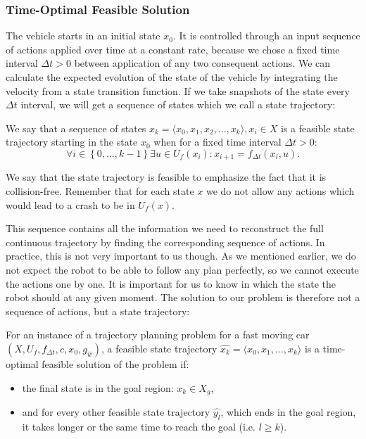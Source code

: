 \subsubsection{Time-Optimal Feasible Solution}

The vehicle starts in an initial state $x_0$. It is controlled through an input sequence of actions applied over time at a constant rate, because we chose a fixed time interval $\Delta t>0$ between application of any two consequent actions. We can calculate the expected evolution of the state of the vehicle by integrating the velocity from a state transition function. If we take snapshots of the state every $\Delta t$ interval, we will get a sequence of states which we call a state trajectory:

\begin{defn}
	We say that a sequence of states $\hat{x_k}=\langle x_0,x_1,x_2,\dots,x_k \rangle ,x_i\in X$ is a feasible state trajectory starting in the state $x_0$ when for a fixed time interval $\Delta t>0$:
	\[
	\forall i \in \left\{ 0,\ldots,k-1\right\} \exists u\in U_f(x_i): x_{i+1}=f_{\Delta t} (x_i,u).
	\]
\end{defn}

We say that the state trajectory is feasible to emphasize the fact that it is collision-free. Remember that for each state $x$ we do not allow any actions which would lead to a crash to be in $U_f(x)$.

This sequence contains all the information we need to reconstruct the full continuous trajectory by finding the corresponding sequence of actions. In practice, this is not very important to us though. As we mentioned earlier, we do not expect the robot to be able to follow any plan perfectly, so we cannot execute the actions one by one. It is important for us to know in which the state the robot should at any given moment. The solution to our problem is therefore not a sequence of actions, but a state trajectory:

\begin{defn}
	For an instance of a trajectory planning problem for a fast moving car $\left(X, U_f, f_{\Delta t}, c, x_0, g_{\hat{w}}\right)$, a feasible state trajectory $\hat{x_k}=\langle x_0, x_1, \ldots, x_k \rangle$ is a time-optimal feasible solution of the problem if:
	\begin{itemize}
		\item the final state is in the goal region: $x_k \in X_g$,
		\item and for every other feasible state trajectory $\hat{y_l}$, which ends in the goal region, it takes longer or the same time to reach the goal (i.e. $l \geq k$).
	\end{itemize}
\end{defn}

